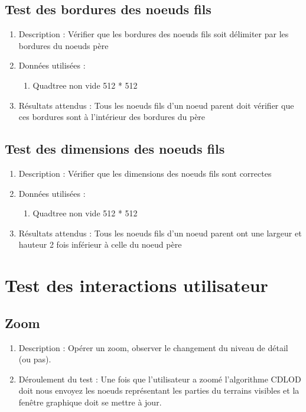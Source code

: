 \documentclass[12pt]{report}
\begin{document}
\subsection{Test des bordures des noeuds fils}
\begin{enumerate}
    \item Description : Vérifier que les bordures des noeuds fils soit délimiter par les bordures du noeuds père
    \item Données utilisées :
    \begin{enumerate}
        \item Quadtree non vide 512 * 512
    \end{enumerate}
    \item Résultats attendus : Tous les noeuds fils d'un noeud parent doit vérifier que ces bordures sont à l'intérieur des bordures du père
\end{enumerate}

\subsection{Test des dimensions des noeuds fils}
\begin{enumerate}
    \item Description : Vérifier que les dimensions des noeuds fils sont correctes
    \item Données utilisées :
    \begin{enumerate}
        \item Quadtree non vide 512 * 512
    \end{enumerate}
    \item Résultats attendus : Tous les noeuds fils d'un noeud parent ont une largeur et hauteur 2 fois inférieur à celle du noeud père
\end{enumerate}


\section{Test des interactions utilisateur}
\subsection{Zoom}
\begin{enumerate}
    \item Description : Opérer un zoom, observer le changement du niveau de détail (ou pas).
    \item Déroulement du test : Une fois que l'utilisateur a zoomé l'algorithme CDLOD doit nous envoyez les noeuds représentant les parties du terrains visibles et la fenêtre graphique doit se mettre à jour.
\end{enumerate}
\end{document}
